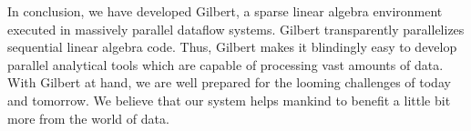 In conclusion, we have developed Gilbert, a sparse linear algebra environment executed in massively parallel dataflow systems.
Gilbert transparently parallelizes sequential linear algebra code.
Thus, Gilbert makes it blindingly easy to develop parallel analytical tools which are capable of processing vast amounts of data.
With Gilbert at hand, we are well prepared for the looming challenges of today and tomorrow.
We believe that our system helps mankind to benefit a little bit more from the world of data.

